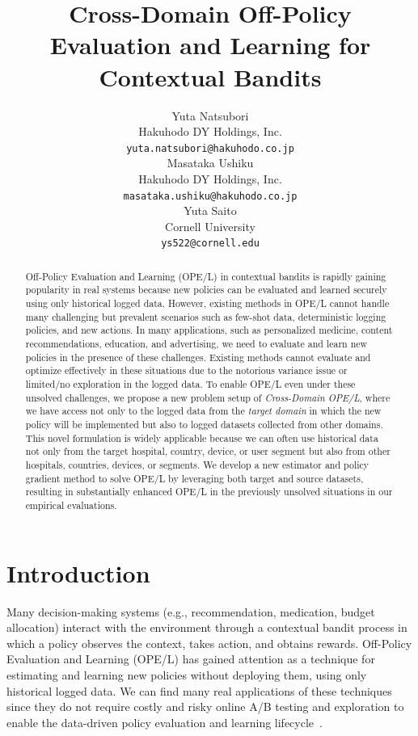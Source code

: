 \documentclass{article} %
\title{Cross-Domain Off-Policy Evaluation and Learning for Contextual Bandits}
\author{Yuta Natsubori\\
Hakuhodo DY Holdings, Inc.\\
\texttt{yuta.natsubori@hakuhodo.co.jp} \\
\And
Masataka Ushiku\\
Hakuhodo DY Holdings, Inc.\\
\texttt{masataka.ushiku@hakuhodo.co.jp} \\
\And 
Yuta Saito \\
Cornell University \\
\texttt{ys522@cornell.edu}
}
\theoremstyle{definition}
\begin{document}
\maketitle

\begin{abstract}
Off-Policy Evaluation and Learning (OPE/L) in contextual bandits is rapidly gaining popularity in real systems because new policies can be evaluated and learned securely using only historical logged data. However, existing methods in OPE/L cannot handle many challenging but prevalent scenarios such as few-shot data, deterministic logging policies, and new actions. In many applications, such as personalized medicine, content recommendations, education, and advertising, we need to evaluate and learn new policies in the presence of these challenges. Existing methods cannot evaluate and optimize effectively in these situations due to the notorious variance issue or limited/no exploration in the logged data. To enable OPE/L even under these unsolved challenges, we propose a new problem setup of \textit{Cross-Domain OPE/L}, where we have access not only to the logged data from the \textit{target domain} in which the new policy will be implemented but also to logged datasets collected from other domains. This novel formulation is widely applicable because we can often use historical data not only from the target hospital, country, device, or user segment but also from other hospitals, countries, devices, or segments. We develop a new estimator and policy gradient method to solve OPE/L by leveraging both target and source datasets, resulting in substantially enhanced OPE/L in the previously unsolved situations in our empirical evaluations.


\end{abstract}

\section{Introduction}
Many decision-making systems (e.g., recommendation, medication, budget allocation) interact with the environment through a contextual bandit process in which a policy observes the context, takes action, and obtains rewards. Off-Policy Evaluation and Learning (OPE/L) has gained attention as a technique for estimating and learning new policies without deploying them, using only historical logged data. We can find many real applications of these techniques since they do not require costly and risky online A/B testing and exploration to enable the data-driven policy evaluation and learning lifecycle~\citep{mehrotra2018towards,gilotte2018offline,saito2021evaluating,kiyohara2024towards}.
\end{document}
